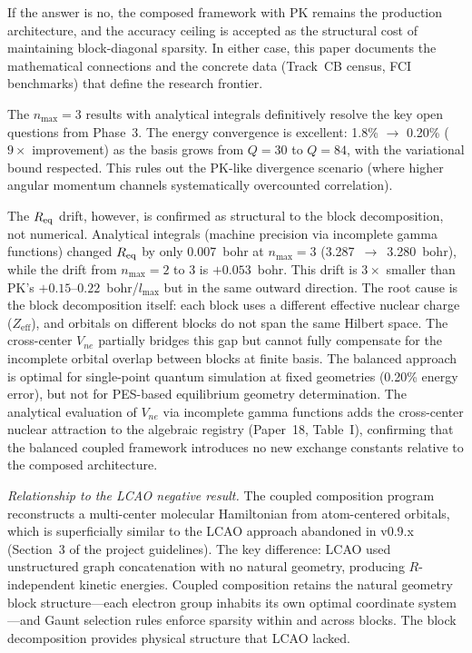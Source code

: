 \documentclass[aps,pra,twocolumn,superscriptaddress,longbibliography]{revtex4-2}
\begin{document}
If the answer is no, the composed framework with PK remains the
production architecture, and the accuracy ceiling is accepted as the
structural cost of maintaining block-diagonal sparsity.  In either
case, this paper documents the mathematical connections and the
concrete data (Track~CB census, FCI benchmarks) that define the
research frontier.

The $n_{\max} = 3$ results with analytical integrals definitively
resolve the key open questions from Phase~3.  The energy convergence
is excellent: 1.8\% $\to$ 0.20\% ($9\times$ improvement) as the
basis grows from $Q = 30$ to $Q = 84$, with the variational bound
respected.  This rules out the PK-like divergence scenario (where
higher angular momentum channels systematically overcounted
correlation).

The $R_{\rm eq}$ drift, however, is confirmed as structural to the
block decomposition, not numerical.  Analytical integrals (machine
precision via incomplete gamma functions) changed $R_{\rm eq}$ by
only 0.007~bohr at $n_{\max} = 3$ (3.287~$\to$~3.280~bohr), while
the drift from $n_{\max} = 2$ to 3 is $+0.053$~bohr.  This drift
is $3\times$ smaller than PK's $+0.15$--$0.22$~bohr/$l_{\max}$ but
in the same outward direction.  The root cause is the block
decomposition itself: each block uses a different effective nuclear
charge ($Z_{\mathrm{eff}}$), and orbitals on different blocks do not
span the same Hilbert space.  The cross-center $V_{ne}$ partially
bridges this gap but cannot fully compensate for the incomplete
orbital overlap between blocks at finite basis.  The balanced
approach is optimal for single-point quantum simulation at fixed
geometries (0.20\% energy error), but not for PES-based equilibrium
geometry determination.  The analytical evaluation of $V_{ne}$ via
incomplete gamma functions adds the cross-center nuclear attraction
to the algebraic registry (Paper~18, Table~I), confirming that the
balanced coupled framework introduces no new exchange constants
relative to the composed architecture.

\emph{Relationship to the LCAO negative result.}  The coupled
composition program reconstructs a multi-center molecular Hamiltonian
from atom-centered orbitals, which is superficially similar to the
LCAO approach abandoned in v0.9.x (Section~3 of the project
guidelines).  The key difference: LCAO used unstructured graph
concatenation with no natural geometry, producing $R$-independent
kinetic energies.  Coupled composition retains the natural geometry
block structure---each electron group inhabits its own optimal
coordinate system---and Gaunt selection rules enforce sparsity within
and across blocks.  The block decomposition provides physical
structure that LCAO lacked.
\end{document}
